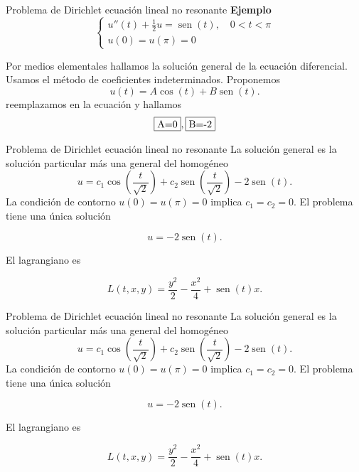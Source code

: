 \documentclass[handout,hyperref={colorlinks=true}]{beamer}
\DeclareMathOperator{\sen}{sen}
\begin{document}
\begin{frame}{Problema de Dirichlet ecuación lineal  no resonante}
\textbf{Ejemplo}
\[\left\{ \begin{array}{l}
            u''(t)+\frac12 u=\sen(t),\quad 0<t<\pi\\
            u(0)=u(\pi)=0
          \end{array}
          \right.
\]

Por medios elementales hallamos la solución general de la ecuación diferencial. Usamos el método de coeficientes indeterminados. Proponemos 
\[u(t)=A\cos(t)+B\sen(t).\]
reemplazamos en la ecuación y hallamos
\[\fbox{A=0}, \fbox{B=-2}\]


\end{frame}





\begin{frame}{Problema de Dirichlet ecuación lineal  no resonante}
La solución general es la solución particular más una general del homogéneo
\[u=c_1\cos\left(\frac{t}{\sqrt{2}}\right)+c_2\sen\left(\frac{t}{\sqrt{2}}\right)-2\sen(t).\]
La condición de contorno $ u(0)=u(\pi)=0$ implica $c_1=c_2=0$. El problema tiene una única solución

\[\boxed{u=-2\sen(t).}\]

El lagrangiano es

\[L(t,x,y)=\frac{y^2}{2}-\frac{x^2}{4}+\sen(t) x.\]
\end{frame}

\begin{frame}{Problema de Dirichlet ecuación lineal  no resonante}
La solución general es la solución particular más una general del homogéneo
\[u=c_1\cos\left(\frac{t}{\sqrt{2}}\right)+c_2\sen\left(\frac{t}{\sqrt{2}}\right)-2\sen(t).\]
La condición de contorno $ u(0)=u(\pi)=0$ implica $c_1=c_2=0$. El problema tiene una única solución

\[\boxed{u=-2\sen(t).}\]

El lagrangiano es

\[L(t,x,y)=\frac{y^2}{2}-\frac{x^2}{4}+\sen(t) x.\]
\end{frame}
\end{document}

